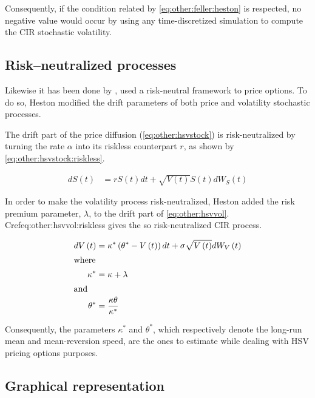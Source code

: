 \documentclass[12pt,a4paper]{report}
\newcommand{\Bmsub}[1]{W_{#1}\left(t\right)}
\newcommand{\St}{S\left(t\right)}
\newcommand{\Vt}{V\left(t\right)}
\newcommand{\HSVstockriskless}{
  d\St &= r \St dt + \sqrt{\Vt} \St d \Bmsub{S}
}
\newcommand{\HSVvolriskless}{
  d\Vt &= \kappa^{*} \left(\theta^{*} - \Vt \right) dt + \sigma \sqrt{\Vt} d \Bmsub{V}
}
\begin{document}
Consequently, if the condition related by \cref{eq:other:feller:heston} is respected, no negative value would occur by using any time-discretized simulation to compute the CIR stochastic volatility.

\subsection{Risk--neutralized processes}
\label{sub:other:heston:risk}

Likewise it has been done by \citet{bs}, \citet{heston1993} used a risk-neutral framework to price options.
To do so, Heston modified the drift parameters of both price and volatility stochastic processes.

The drift part of the price diffusion (\cref{eq:other:hsvstock}) is risk-neutralized by turning the rate $\alpha$ into its riskless counterpart $r$, as shown by \cref{eq:other:hsvstock:riskless}.

\begin{align}
    \HSVstockriskless \label{eq:other:hsvstock:riskless}
\end{align}

In order to make the volatility process risk-neutralized, Heston added the risk premium parameter, $\lambda$, to the drift part of \cref{eq:other:hsvvol}. Cref{eq:other:hsvvol:riskless} gives the so risk-neutralized CIR process.

\begin{align}
    \HSVvolriskless \label{eq:other:hsvvol:riskless} \\
    \intertext{where}
    \kappa^{*} & = \kappa + \lambda \label{eq:other:kappa:riskless} \\
    \intertext{and}
    \theta^{*} & = \frac{\kappa \theta}{\kappa^{*}} \label{eq:other:theta:riskless}
\end{align}

Consequently, the parameters $\kappa^{*}$ and $\theta^{*}$, which respectively denote the long-run mean and mean-reversion speed, are the ones to estimate while dealing with HSV pricing options purposes. 

\subsection{Graphical representation}
\label{sub:other:heston:graphical}   
\end{document}
